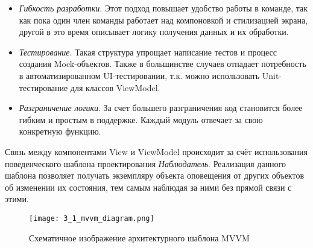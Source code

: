 \begin{itemize}
    \item \emph{Гибкость разработки}.
    Этот подход повышает удобство работы в команде, так как пока один член команды работает над компоновкой и стилизацией экрана, другой в это время описывает логику получения данных и их обработки.
    \item \emph{Тестирование}.
    Такая структура упрощает написание тестов и процесс создания Mock-объектов.
    Также в большинстве случаев отпадает потребность в автоматизированном UI-тестировании, т.к. можно использовать Unit-тестирование для классов ViewModel.
    \item \emph{Разграничение логики}.
    За счет большего разграничения код становится более гибким и простым в поддержке.
    Каждый модуль отвечает за свою конкретную функцию.
\end{itemize}

Связь между компонентами View и ViewModel происходит за счёт использования поведенческого шаблона проектирования \emph{Наблюдатель}.
Реализация данного шаблона позволяет получать экземпляру объекта оповещения от других объектов об изменении их состояния, тем самым наблюдая за ними без прямой связи с этими.

\begin{figure}[H]
    \centering
    \texttt{[image: 3\_1\_mvvm\_diagram.png]}
    \caption{Схематичное изображение архитектурного шаблона MVVM}
    \label{fig:design:architecture:mvvm}
\end{figure}